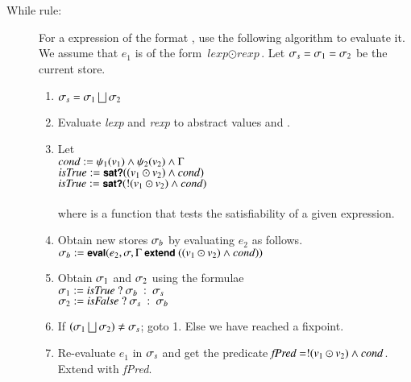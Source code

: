\begin{description}
\item[While rule:] 
For a  expression of the format \while , use the following algorithm to evaluate it. We assume that $e_1$ is of the form $\textit{lexp} \odot \textit{rexp}$. Let $\sigma_s = \sigma_1 = \sigma_2$ be the current store. 
\begin{enumerate}
\item
$\sigma_s = \sigma_1 \bigsqcup \sigma_2$
\item
Evaluate \textit{lexp} and \textit{rexp} to abstract values  and .
\item
Let\\ 
$\textit{cond} := \psi_{1}(v_{1}) \land \psi_{2}(v_{2}) \land \Gamma$ \\
$\textit{isTrue} := \mbox{\sffamily{\bfseries\small {sat?}}}((v_1 \odot v_2) \land cond)$ \\
$\textit{isTrue} := \mbox{\sffamily{\bfseries\small {sat?}}}(!(v_1 \odot v_2) \land cond)$ \\
\\
where  is a function that tests the satisfiability of a given expression.
\item
Obtain new stores $\sigma_b$ by evaluating $e_2$ as follows.\\
$\store_b := \kw{eval}(e_2, \store, \EA\ \kw{extend}\ ((v_1 \odot v_2) \logand cond))$
\item
Obtain $\sigma_1$ and $\sigma_2$ using the formulae \\
$\store_1 := \textit{isTrue}\ ?\ \store_b\ :\ \store_s$\\
$\store_2 := \textit{isFalse}\ ?\ \store_s\ :\ \store_b$
\item
If $(\sigma_1 \bigsqcup \sigma_2) \neq \sigma_s$; goto 1. Else we have reached a fixpoint.
\item
Re-evaluate $e_1$ in $\sigma_s$ and get the predicate $\textit{fPred} = !(v_1 \odot v_2) \land cond$. Extend \EA with \textit{fPred}.
\end{enumerate}
\end{description}

